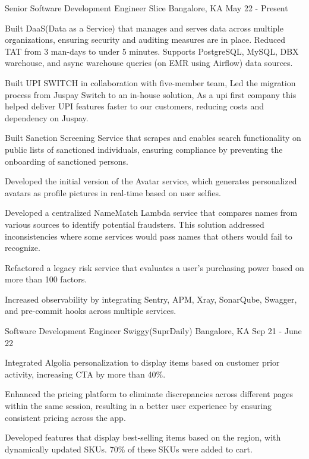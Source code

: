 \begin{cventries}
  \cventry
    {Senior Software Development Engineer}
    {Slice}
    {Bangalore, KA}
    {May 22 - Present}
    {
      \begin{cvitems}
        \item {Built DaaS(Data as a Service) that manages and serves data across multiple organizations, ensuring security and auditing measures are in place. Reduced TAT from 3 man-days to under 5 minutes. Supports PostgreSQL, MySQL, DBX warehouse, and async warehouse queries (on EMR using Airflow) data sources.}
        \item {Built UPI SWITCH in collaboration with five-member team, Led the migration process from Juspay Switch to an in-house solution, As a upi first company this helped deliver UPI features faster to our customers, reducing costs and dependency on Juspay.}
        \item {Built Sanction Screening Service that scrapes and enables search functionality on public lists of sanctioned individuals, ensuring compliance by preventing the onboarding of sanctioned persons.}
        \item {Developed the initial version of the Avatar service, which generates personalized avatars as profile pictures in real-time based on user selfies.}
        \item {Developed a centralized NameMatch Lambda service that compares names from various sources to identify potential fraudsters. This solution addressed inconsistencies where some services would pass names that others would fail to recognize.}
        \item {Refactored a legacy risk service that evaluates a user's purchasing power based on more than 100 factors.}
        \item {Increased observability by integrating Sentry, APM, Xray, SonarQube, Swagger, and pre-commit hooks across multiple services.}
      \end{cvitems}
    }
  
  \cventry
    {Software Development Engineer}
    {Swiggy(SuprDaily)}
    {Bangalore, KA}
    {Sep 21 - June 22}
    {
      \begin{cvitems}
        \item {Integrated Algolia personalization to display items based on customer prior activity, increasing CTA by more than 40\%.}
        \item {Enhanced the pricing platform to eliminate discrepancies across different pages within the same session, resulting in a better user experience by ensuring consistent pricing across the app.}
        \item {Developed features that display best-selling items based on the region, with dynamically updated SKUs. 70\% of these SKUs were added to cart.}
      \end{cvitems}
    }
  

\end{cventries}
